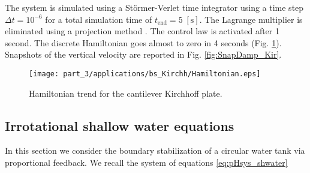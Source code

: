 The system is simulated using a St\"ormer-Verlet time integrator \cite{hairer2003geometric} using a time step $\Delta t = 10^{-6}$ for a total simulation time of $t_{\text{end}} = 5 \; \mathrm{[s]}$. The Lagrange multiplier is eliminated using a projection method \cite{benner2015time}. The control law is activated after 1 second. The discrete Hamiltonian goes almost to zero in 4 seconds (Fig. \ref{fig:H_bs_Kirchhoff}). Snapshots of the vertical velocity are reported in Fig. \ref{fig:SnapDamp_Kir}. 


\begin{figure}[htb]
	\centering
	\texttt{[image: part\_3/applications/bs\_Kirchh/Hamiltonian.eps]}
	\caption{Hamiltonian trend for the cantilever Kirchhoff plate.}
	\label{fig:H_bs_Kirchhoff}
\end{figure}

\begin{figure*}[p]
	\centering
	\hfil
	\hfil
	\hfil
	\hfil
	\caption{Snapshots at different times of the simulation of the boundary controlled cantilever Kirchhoff plate.}
	\label{fig:SnapDamp_Kir}
	\hfil
\end{figure*}



\subsection{Irrotational shallow water equations}
In this section we consider the boundary stabilization of a circular water tank via proportional feedback. We recall the system of equations \eqref{eq:pHsys_shwater}

